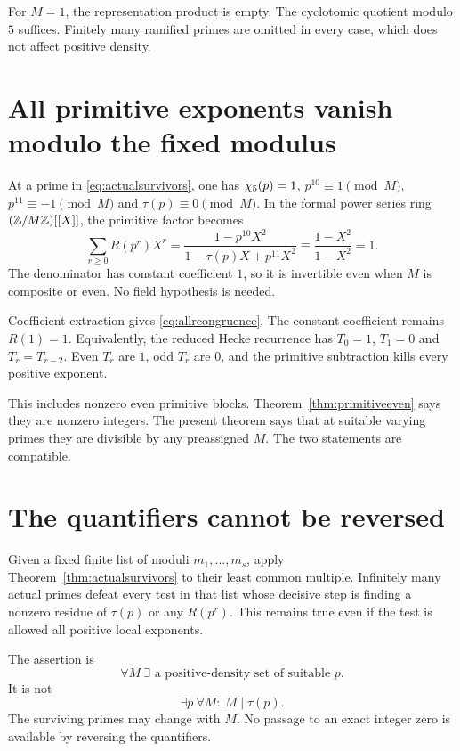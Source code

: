 For $M=1$, the representation product is empty. The cyclotomic quotient modulo $5$ suffices. Finitely many ramified primes are omitted in every case, which does not affect positive density.


\section{All primitive exponents vanish modulo the fixed modulus}
At a prime in \eqref{eq:actualsurvivors}, one has $\chi_5(p)=1$, $p^{10}\equiv1\pmod M$, $p^{11}\equiv-1\pmod M$ and $\tau(p)\equiv0\pmod M$. In the formal power series ring $(\mathbb Z/M\mathbb Z)[[X]]$, the primitive factor becomes
\[
\sum_{r\ge0}R(p^r)X^r
=\frac{1-p^{10}X^2}{1-\tau(p)X+p^{11}X^2}
\equiv\frac{1-X^2}{1-X^2}=1.
\]
The denominator has constant coefficient $1$, so it is invertible even when $M$ is composite or even. No field hypothesis is needed.

Coefficient extraction gives \eqref{eq:allrcongruence}. The constant coefficient remains $R(1)=1$. Equivalently, the reduced Hecke recurrence has $T_0=1$, $T_1=0$ and $T_r=T_{r-2}$. Even $T_r$ are $1$, odd $T_r$ are $0$, and the primitive subtraction kills every positive exponent.

This includes nonzero even primitive blocks. Theorem~\ref{thm:primitiveeven} says they are nonzero integers. The present theorem says that at suitable varying primes they are divisible by any preassigned $M$. The two statements are compatible.

\section{The quantifiers cannot be reversed}
Given a fixed finite list of moduli $m_1,\ldots,m_s$, apply Theorem~\ref{thm:actualsurvivors} to their least common multiple. Infinitely many actual primes defeat every test in that list whose decisive step is finding a nonzero residue of $\tau(p)$ or any $R(p^r)$. This remains true even if the test is allowed all positive local exponents.

The assertion is
\[
\forall M\ \exists\text{ a positive-density set of suitable }p.
\]
It is not
\[
\exists p\ \forall M:\ M\mid\tau(p).
\]
The surviving primes may change with $M$. No passage to an exact integer zero is available by reversing the quantifiers.

